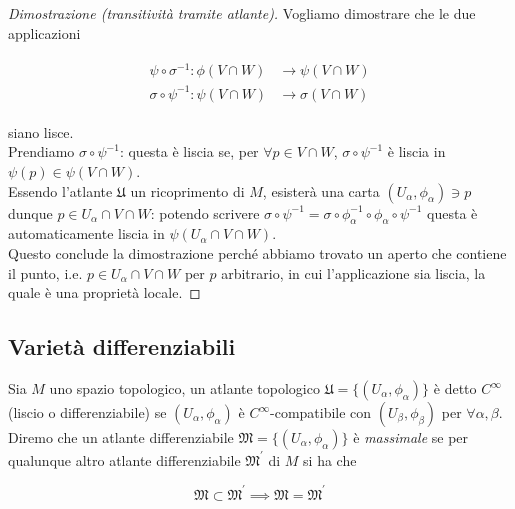 \begin{proof}[Dimostrazione (transitività tramite atlante)]
	Vogliamo dimostrare che le due applicazioni
	
	\begin{align}
		\begin{split}
			\psi \circ \sigma^{-1} : \phi(V \cap W) &\to \psi(V \cap W)\\
			\sigma \circ \psi^{-1} : \psi(V \cap W) &\to \sigma(V \cap W)
		\end{split}
	\end{align}

	siano lisce.\\
	Prendiamo $ \sigma \circ \psi^{-1} $: questa è liscia se, per $ \forall p \in V \cap W $, $ \sigma \circ \psi^{-1} $ è liscia in $ \psi(p) \in \psi(V \cap W) $.\\
	Essendo l'atlante $ \mathfrak{U} $ un ricoprimento di $ M $, esisterà una carta $ (U_{\alpha},\phi_{\alpha}) \ni p $ dunque $ p \in U_{\alpha} \cap V \cap W $: potendo scrivere $ \sigma \circ \psi^{-1} = \sigma \circ \phi_{\alpha}^{-1} \circ \phi_{\alpha} \circ \psi^{-1} $ questa è automaticamente liscia in $ \psi(U_{\alpha} \cap V \cap W) $.\\
	Questo conclude la dimostrazione perché abbiamo trovato un aperto che contiene il punto, i.e. $ p \in U_{\alpha} \cap V \cap W $ per $ p $ arbitrario, in cui l'applicazione sia liscia, la quale è una proprietà locale.
	
\end{proof}

\subsection{Varietà differenziabili}

Sia $ M $ uno spazio topologico, un atlante topologico $ \mathfrak{U} = \{(U_{\alpha},\phi_{\alpha})\} $ è detto $ C^{\infty} $ (liscio o differenziabile) se $ (U_{\alpha},\phi_{\alpha}) $ è $ C^{\infty} $-compatibile con $ (U_{\beta},\phi_{\beta}) $ per $ \forall \alpha,\beta $.\\
Diremo che un atlante differenziabile $ \mathfrak{M} = \{(U_{\alpha},\phi_{\alpha})\} $ è \textit{massimale} se per qualunque altro atlante differenziabile $ \mathfrak{M}^{\prime} $ di $ M $ si ha che

\begin{equation}
	\mathfrak{M} \subset \mathfrak{M}^{\prime} \implies \mathfrak{M} = \mathfrak{M}^{\prime}
\end{equation}

